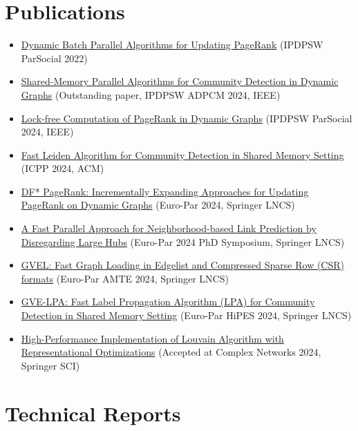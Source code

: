 \section*{Publications}

\begin{itemize}[noitemsep, leftmargin=*]
  \item \href{https://ieeexplore.ieee.org/abstract/document/9835216/}{Dynamic Batch Parallel Algorithms for Updating PageRank} (IPDPSW ParSocial 2022)
  \item \href{https://ieeexplore.ieee.org/abstract/document/10596428/}{Shared-Memory Parallel Algorithms for Community Detection in Dynamic Graphs} (Outstanding paper, IPDPSW ADPCM 2024, IEEE)
  \item \href{https://ieeexplore.ieee.org/abstract/document/10596502/}{Lock-free Computation of PageRank in Dynamic Graphs} (IPDPSW ParSocial 2024, IEEE)
  \item \href{https://dl.acm.org/doi/abs/10.1145/3673038.3673146}{Fast Leiden Algorithm for Community Detection in Shared Memory Setting} (ICPP 2024, ACM)
  \item \href{https://link.springer.com/chapter/10.1007/978-3-031-69583-4_22}{DF* PageRank: Incrementally Expanding Approaches for Updating PageRank on Dynamic Graphs} (Euro-Par 2024, Springer LNCS)
  \item \href{https://arxiv.org/abs/2401.11415}{A Fast Parallel Approach for Neighborhood-based Link Prediction by Disregarding Large Hubs} (Euro-Par 2024 PhD Symposium, Springer LNCS)
  \item \href{https://arxiv.org/abs/2311.14650}{GVEL: Fast Graph Loading in Edgelist and Compressed Sparse Row (CSR) formats} (Euro-Par AMTE 2024, Springer LNCS)
  \item \href{https://arxiv.org/abs/2312.08140}{GVE-LPA: Fast Label Propagation Algorithm (LPA) for Community Detection in Shared Memory Setting} (Euro-Par HiPES 2024, Springer LNCS)
  \item \href{https://arxiv.org/abs/2312.04876}{High-Performance Implementation of Louvain Algorithm with Representational Optimizations} (Accepted at Complex Networks 2024, Springer SCI)
\end{itemize}




\section*{Technical Reports}

